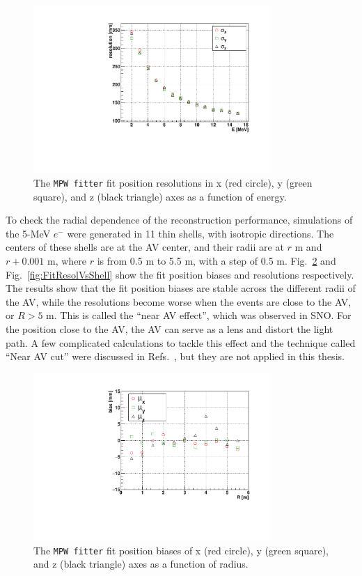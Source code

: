 \begin{figure}[htbp]
	\centering	
	\includegraphics[width=9cm]{MPW_isoFill_posResolVsE.pdf}
	\caption[The \texttt{MPW fitter} fit position resolutions ($\sigma_{x,y,z}$) as a function of energy.]{The \texttt{MPW fitter} fit position resolutions in x (red circle), y (green square), and z (black triangle) axes as a function of energy.}
	\label{fig:MPWposResol_isoFill}
\end{figure}

To check the radial dependence of the reconstruction performance, simulations of the 5-MeV $e^-$ were generated in 11 thin shells, with isotropic directions. The centers of these shells are at the AV center, and their radii are at $r$ m and $r+0.001$ m, where $r$ is from 0.5 m to 5.5 m, with a step of 0.5 m. Fig.~\ref{fig:FitBiasVsShell} and Fig.~\ref{fig:FitResolVsShell} show the fit position biases and resolutions respectively. The results show that the fit position biases are stable across the different radii of the AV, while the resolutions become worse when the events are close to the AV, or $R>5$ m. This is called the ``near AV effect'', which was observed in SNO. For the position close to the AV, the AV can serve as a lens and distort the light path\cite{brice1996monte}. A few complicated calculations to tackle this effect and the technique called ``Near AV cut'' were discussed in Refs.~\cite{coulter2013modelling,jones2011background}, but they are not applied in this thesis. 

\begin{figure}[htbp]
	\centering	
	\includegraphics[width=9cm]{shellTest_RvsBias.pdf}
	\caption[The \texttt{MPW fitter} fit position biases ($\mu_{x,y,z}$) as a function of energies.]{The \texttt{MPW fitter} fit position biases of x (red circle), y (green square), and z (black triangle) axes as a function of radius.}
	\label{fig:FitBiasVsShell}
\end{figure}

